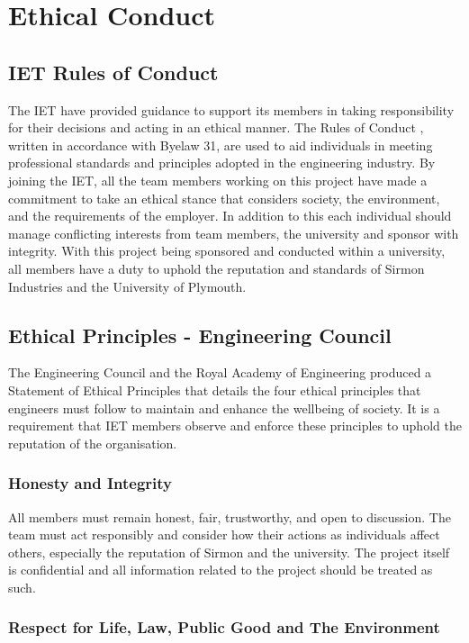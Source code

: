 \documentclass [12pt]{article}
\begin{document}
\section{Ethical Conduct}\label{sec:ethics}
\subsection{IET Rules of Conduct}\label{sec:IET_rules_of_conduct}
The IET have provided guidance to support its members in taking responsibility for their decisions and acting in an ethical manner. The Rules of Conduct \cite{Rules_of_Conduct}, written in accordance with Byelaw 31, are used to aid individuals in meeting professional standards and principles adopted in the engineering industry. By joining the IET, all the team members working on this project have made a commitment to take an ethical stance that considers society, the environment, and the requirements of the employer. In addition to this each individual should manage conflicting interests from team members, the university and sponsor with integrity. With this project being sponsored and conducted within a university, all members have a duty to uphold the reputation and standards of Sirmon Industries and the University of Plymouth.

\subsection{Ethical Principles - Engineering Council}\label{sec:ethical_principles_engc}

The Engineering Council and the Royal Academy of Engineering produced a Statement of Ethical Principles that details the four ethical principles that engineers must follow to maintain and enhance the wellbeing of society. It is a requirement that IET members observe and enforce these principles to uphold the reputation of the organisation.

\subsubsection{Honesty and Integrity}

All members must remain honest, fair, trustworthy, and open to discussion. The team must act responsibly and consider how their actions as individuals affect others, especially the reputation of Sirmon and the university. The project itself is confidential and all information related to the project
should be treated as such.

\subsubsection{Respect for Life, Law, Public Good and The Environment}
\end{document}
